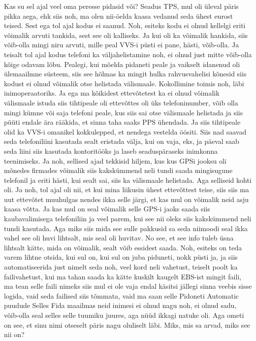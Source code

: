 Kas su sel ajal veel oma peresse pidasid või?
Seadus TPS, mul oli üleval päris pikka aega, ehk siis noh, ma olen nii-öelda kaasa vedanud seda ühest eurost teised. Sest ega tol ajal kodus ei saanud. Noh, esiteks kodu ei olnud kellelgi eriti võimalik arvuti tankida, sest see oli kalliseks. Ja kui oli ka võimalik hankida, siis võib-olla mingi niru arvuti, mille peal VVS-i püsti ei pane, hästi, võib-olla. Ja teisalt tol ajal kodus telefoni ka väljahelistamine noh, ei olnud just mitte võib-olla kõige odavam lõbu. Pealegi, kui mõelda pidaneti peale ja vaikselt idanenud oli ülemaailmne süsteem, siis see hõlmas ka mingit hulka rahvusvahelisi kõnesid siis kodust ei olnud võimalik otse helistada välismaale. Kokollimine toimis noh, läbi inimoperaatoriks. Ja ega ma kõikidest ettevõtetest ka ei olnud võimalik välismaale istuda siis tihtipeale oli ettevõttes oli üks telefoninumber, võib olla mingi kümne või saja telefoni peale, kus siis sai otse välismaale helistada ja siis püüti endale ära rääkida, et sinna taha saaks PPS ühendada. Ja siis tihtipeale olid ka VVS-i omanikel kokkulepped, et nendega vestelda öösiti. Siis nad saavad seda telefoniliini kasutada sealt eristada välja, kui on vaja, eks, ja päeval saab seda liini siis kasutada kontoritööks ja laseb seaduspäraseks inimkonna teenimiseks. Ja noh, sellised ajad tekkisid hiljem, kus kus GPSi jooksu oli mõnedes firmades võimalik siis kakskümmend neli tundi saada mingisugune telefonil ja eriti hästi, kui sealt sai, siis ka välismaale helistada. Aga selliseid kohti oli. Ja noh, tol ajal oli nii, et kui mina liikusin ühest ettevõttest teise, siis siis ma uut ettevõtet muuhulgas nendes ikka selle järgi, et kas mul on võimalik neid asju kaasa võtta. Ja kas mul on seal võimalik selle GPS-i jaoks saada siis kaubavalimisega telefoniliin ja veel parem, kui see nii oleks siis kakskümmend neli tundi kasutada.
Aga miks siis mida see sulle pakkusid sa seda niimoodi seal ikka vahel see oli huvi lihtsalt, mis seal oli huvitav.
No see, et see info tuleb üsna lihtsalt kätte, mida on võimalik, sealt võib essidest saada. Noh, esiteks on teda varem lihtne otsida, kui sul on, kui sul on juba piduneti, nokk püsti ja, ja siis automatiseerida just nimelt seda noh, veel kord neli vahetust, teiselt poolt ka failivahetust, kui ma tahan saada ka kätte kuskilt kaugelt EBS-ist mingit faili, ma tean selle faili nimeks siis mul ei ole vaja endal käsitsi jällegi sinna veebis sisse logida, vaid seda failised siis tõmmata, vaid ma saan selle Pidoneti Automatic puudude
Selles Fida maailmas neid inimesi ei olnud nagu noh, ei olnud sadu, võib-olla seal selles selle tuumiku juures, aga nüüd ikkagi natuke oli. Aga ometi on see, et sinu nimi otseselt päris nagu oluliselt läbi. Miks, mis sa arvad, miks see nii on?
